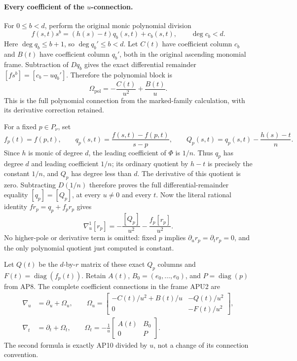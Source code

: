 \paragraph{Every coefficient of the \(u\)-connection.}
For \(0\leq b<d\), perform the original monic polynomial division
\[
 f(s,t)s^b=(h(s)-t)q_b(s,t)+c_b(s,t),\qquad \deg c_b<d.
\]
Here \(\deg q_b\leq b+1\), so \(\deg q_b'\leq b<d\).
Let \(C(t)\) have coefficient column \(c_b\) and \(B(t)\) have
coefficient column \(q_b'\), both in the original ascending monomial
frame.  Subtraction of \(Dq_b\) gives the exact differential remainder
\([fs^b]=[c_b-uq_b']\).  Therefore the polynomial block is
\[
 \Omega_{\mathrm{pol}}
       =-\frac{C(t)}{u^2}+\frac{B(t)}u .
 \tag{APU6}
\]
This is the full polynomial connection from the marked-family
calculation, with its derivative correction retained.

For a fixed \(p\in P_\nu\), set
\[
 f_p(t)=f(p,t),\qquad
 q_p(s,t)=\frac{f(s,t)-f(p,t)}{s-p},\qquad
 Q_p(s,t)=q_p(s,t)-\frac{h(s)-t}{n}.
 \tag{APU7}
\]
Since \(h\) is monic of degree \(d\), the leading coefficient of
\(\Phi\) is \(1/n\).  Thus \(q_p\) has degree \(d\) and leading
coefficient \(1/n\); its ordinary quotient by \(h-t\) is precisely
the constant \(1/n\), and \(Q_p\) has degree less than \(d\).
The derivative of this quotient is zero.  Subtracting \(D(1/n)\)
therefore proves the full differential-remainder equality
\([q_p]=[Q_p]\), at every \(u\ne0\) and every \(t\).
Now the literal rational identity
\(fr_p=q_p+f_pr_p\) gives
\[
 \nabla_u^1[r_p]
     =-\frac{[Q_p]}{u^2}-\frac{f_p[r_p]}{u^2}.
 \tag{APU8}
\]
No higher-pole or derivative term is omitted: fixed \(p\) implies
\(\partial_u r_p=\partial_t r_p=0\), and the only polynomial
quotient just computed is constant.

Let \(Q(t)\) be the \(d\)-by-\(r\) matrix of these exact \(Q_p\)
columns and \(F(t)=\operatorname{diag}(f_p(t))\).
Retain \(A(t)\), \(B_0=(e_0,\ldots,e_0)\), and
\(P=\operatorname{diag}(p)\) from AP8.  The complete coefficient
connections in the frame APU2 are
\[
 \boxed{\displaystyle
 \begin{aligned}
 \nabla_u&=\partial_u+\Omega_u,\qquad
 \Omega_u=
 \begin{bmatrix}
 -C(t)/u^2+B(t)/u&-Q(t)/u^2\\
 0&-F(t)/u^2
 \end{bmatrix},\\
 \nabla_t&=\partial_t+\Omega_t,\qquad
 \Omega_t=-\frac1u
 \begin{bmatrix}A(t)&B_0\\0&P\end{bmatrix}.
 \end{aligned}}
 \tag{APU9}
\]
The second formula is exactly AP10 divided by \(u\), not a change
of its connection convention.

